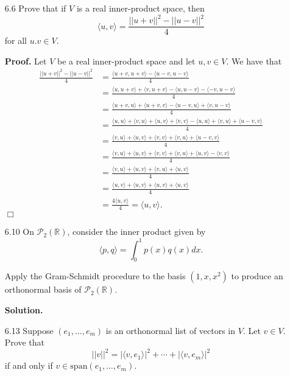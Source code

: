 \documentclass[9pt]{article}
\newcommand{\qed}{\hfill \ensuremath{\Box}}
\newcommand{\R}{\mathbb{R}}
\newcommand{\cyc}[1]{\langle #1 \rangle}
\begin{document}
\begin{enumerate}
   \item[6.6]  Prove that if $V$ is a real inner-product space, then
               $$\cyc{u, v} = \frac{||u + v||^2 - ||u - v||^2}{4}$$
               for all $u. v \in V$.

      \textbf{Proof.} Let $V$ be a real inner-product space and let
      $u, v \in V$. We have that
      \begin{align*}
         \frac{||u + v||^2 - ||u - v||^2}{4}
            &= \frac{\cyc{u + v, u + v} - \cyc{u - v, u - v}}{4} \\
            &= \frac{\cyc{u, u + v} + \cyc{v, u + v} -
                     \cyc{u, u - v} - \cyc{-v, u - v}}{4} \\
            &= \frac{\cyc{u + v, u} + \cyc{u + v, v} -
                     \cyc{u - v, u} + \cyc{v, u - v}}{4} \\
            &= \frac{\cyc{u, u} + \cyc{v, u} + \cyc{u, v} + \cyc{v, v} -
                     \cyc{u, u} + \cyc{v, u} + \cyc{u - v, v}}{4} \\
            &= \frac{\cyc{v, u} + \cyc{u, v} + \cyc{v, v} + 
                     \cyc{v, u} + \cyc{u - v, v}}{4} \\
            &= \frac{\cyc{v, u} + \cyc{u, v} + \cyc{v, v} + 
                     \cyc{v, u} + \cyc{u, v} - \cyc{v, v}}{4} \\
            &= \frac{\cyc{v, u} + \cyc{u, v} + \cyc{v, u} + \cyc{u, v}}{4} \\
            &= \frac{\cyc{u, v} + \cyc{u, v} + \cyc{u, v} + \cyc{u, v}}{4} \\
            &= \frac{4\cyc{u, v}}{4} = \cyc{u, v}.
      \end{align*} \qed
   \item[6.10] On $\mathcal{P}_2(\R)$, consider the inner product given by
               $$\cyc{p, q} = \int_0^1p(x)q(x) dx.$$

               Apply the Gram-Schmidt procedure to the basis $(1, x, x^2)$ to
               produce an orthonormal basis of $\mathcal{P}_2(\R)$.

      \textbf{Solution.} 
   \item[6.13] Suppose $(e_1, \ldots, e_m)$ is an orthonormal list of vectors in
               $V$. Let $v \in V$. Prove that
               $$||v||^2 = |\cyc{v, e_1}|^2 + \cdots + |\cyc{v, e_m}|^2$$
               if and only if $v \in \text{span}(e_1, \ldots, e_m)$.
               

\end{enumerate}
\end{document}
